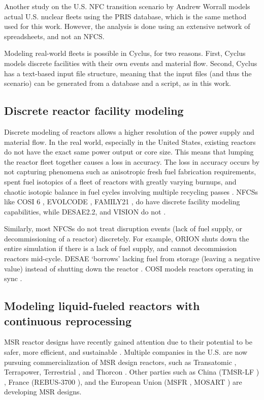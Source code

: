 Another study on the U.S. \gls{NFC} transition scenario by Andrew Worrall \cite{worrall_utilization_2013}
models actual U.S. nuclear fleets using the \gls{PRIS} database, which is the same
method used for this work. However, the analysis is done using an extensive
network of spreadsheets, and not an \gls{NFCS}.

Modeling real-world fleets is possible in Cyclus, for two
reasons. First, Cyclus models
discrete facilities with their own events and material flow.
Second, Cyclus has a text-based input file structure, meaning that
the input files (and thus the scenario) can be generated from 
a database and a script, as in this work.


\subsection{Discrete reactor facility modeling}
Discrete modeling of reactors allows a higher resolution of the power supply and
material flow. In the real world, especially in the United States, existing
reactors do not have the exact same power output or core size. This means that
lumping the reactor fleet together causes a loss in accuracy. The loss in
accuracy occurs by not capturing phenomena such as anisotropic fresh fuel
fabrication requirements, spent fuel isotopics of a fleet of reactors
with greatly varying burnups, and chaotic isotopic balance in fuel
cycles involving multiple recycling passes \cite{huff_next_2010}.
\glspl{NFCS} like COSI 6 \cite{meyer_new_2009}, EVOLCODE \cite{alvarez-velarde_validation_2014},
FAMILY21 \cite{oecd_nuclear_2009},
do have discrete facility modeling capabilities, while
DESAE2.2\cite{tsibulskiy_desae_2006}, and VISION \cite{jacobson_verifiable_2010} do
not \cite{boucher_international_2010}.

Similarly, most \glspl{NFCS} do not treat disruption events (lack of fuel supply,
or decommissioning of a reactor)
discretely. For example, ORION shuts down the entire simulation if there
is a lack of fuel supply, and cannot decommission reactors mid-cycle.
DESAE `borrows' lacking fuel from storage (leaving a
negative value) instead of shutting down the reactor \cite{mccarthy_benchmark_2012}.
COSI models reactors operating in sync \cite{boucher_benchmark_2012}.


\subsection{Modeling liquid-fueled reactors with continuous reprocessing}
\label{sec:msr}
\gls{MSR} reactor designs have recently gained attention due to 
their potential to be 
safer, more efficient, and sustainable \cite{serp_molten_2014}.
Multiple companies in the U.S. are now pursuing
commercialization of \gls{MSR} design reactors, such as Transatomic \cite{transatomic_power_corporation_technical_2016}
, Terrapower, Terrestrial \cite{leblanc_18_2017}, and
Thorcon \cite{jorgensen_19_2017}. Other parties such as China (TMSR-LF \cite{dai_17_2017}) ,
France (REBUS-3700 \cite{mourogov_potentialities_2006}),
and the European Union (MSFR \cite{heuer_towards_2014}, MOSART \cite{ignatiev_molten_2014})
are developing \gls{MSR} designs.

